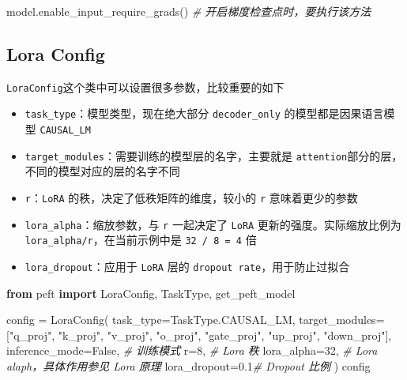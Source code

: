 \documentclass[
]{article}
\newenvironment{Shaded}{}{}
\newcommand{\CommentTok}[1]{\textcolor[rgb]{0.38,0.63,0.69}{\textit{#1}}}
\newcommand{\DecValTok}[1]{\textcolor[rgb]{0.25,0.63,0.44}{#1}}
\newcommand{\FloatTok}[1]{\textcolor[rgb]{0.25,0.63,0.44}{#1}}
\newcommand{\ImportTok}[1]{\textcolor[rgb]{0.00,0.50,0.00}{\textbf{#1}}}
\newcommand{\NormalTok}[1]{#1}
\newcommand{\OperatorTok}[1]{\textcolor[rgb]{0.40,0.40,0.40}{#1}}
\newcommand{\StringTok}[1]{\textcolor[rgb]{0.25,0.44,0.63}{#1}}
\newcommand{\VariableTok}[1]{\textcolor[rgb]{0.10,0.09,0.49}{#1}}
\providecommand{\tightlist}{%
  \setlength{\itemsep}{0pt}\setlength{\parskip}{0pt}}
\begin{document}
\begin{Shaded}
\begin{Highlighting}[]
\NormalTok{model.enable\_input\_require\_grads() }\CommentTok{\# 开启梯度检查点时，要执行该方法}
\end{Highlighting}
\end{Shaded}

\subsection{Lora Config}\label{lora-config}

\texttt{LoraConfig}这个类中可以设置很多参数，比较重要的如下

\begin{itemize}
\tightlist
\item
  \texttt{task\_type}：模型类型，现在绝大部分 \texttt{decoder\_only}
  的模型都是因果语言模型 \texttt{CAUSAL\_LM}
\item
  \texttt{target\_modules}：需要训练的模型层的名字，主要就是
  \texttt{attention}部分的层，不同的模型对应的层的名字不同
\item
  \texttt{r}：\texttt{LoRA} 的秩，决定了低秩矩阵的维度，较小的
  \texttt{r} 意味着更少的参数
\item
  \texttt{lora\_alpha}：缩放参数，与 \texttt{r} 一起决定了 \texttt{LoRA}
  更新的强度。实际缩放比例为\texttt{lora\_alpha/r}，在当前示例中是
  \texttt{32\ /\ 8\ =\ 4} 倍
\item
  \texttt{lora\_dropout}：应用于 \texttt{LoRA} 层的
  \texttt{dropout\ rate}，用于防止过拟合
\end{itemize}

\begin{Shaded}
\begin{Highlighting}[]
\ImportTok{from}\NormalTok{ peft }\ImportTok{import}\NormalTok{ LoraConfig, TaskType, get\_peft\_model}

\NormalTok{config }\OperatorTok{=}\NormalTok{ LoraConfig(}
\NormalTok{    task\_type}\OperatorTok{=}\NormalTok{TaskType.CAUSAL\_LM,}
\NormalTok{    target\_modules}\OperatorTok{=}\NormalTok{[}\StringTok{"q\_proj"}\NormalTok{, }\StringTok{"k\_proj"}\NormalTok{, }\StringTok{"v\_proj"}\NormalTok{, }\StringTok{"o\_proj"}\NormalTok{, }\StringTok{"gate\_proj"}\NormalTok{, }\StringTok{"up\_proj"}\NormalTok{, }\StringTok{"down\_proj"}\NormalTok{],}
\NormalTok{    inference\_mode}\OperatorTok{=}\VariableTok{False}\NormalTok{, }\CommentTok{\# 训练模式}
\NormalTok{    r}\OperatorTok{=}\DecValTok{8}\NormalTok{, }\CommentTok{\# Lora 秩}
\NormalTok{    lora\_alpha}\OperatorTok{=}\DecValTok{32}\NormalTok{, }\CommentTok{\# Lora alaph，具体作用参见 Lora 原理}
\NormalTok{    lora\_dropout}\OperatorTok{=}\FloatTok{0.1}\CommentTok{\# Dropout 比例}
\NormalTok{)}
\NormalTok{config}
\end{Highlighting}
\end{Shaded}
\end{document}
